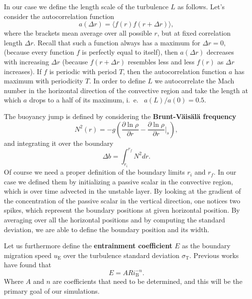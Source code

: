 In our case we define the length scale of the turbulence $L$ as follows. Let's consider the autocorrelation function 
\begin{equation}\label{correlation}
	a(\Delta r)= \langle f(r) f(r + \Delta r) \rangle,
\end{equation}
where the brackets mean average over all possible $r$, but at fixed correlation length $\Delta r$. Recall that such a function always has a maximum for $\Delta r=0$, (because every function $f$ is perfectly equal to itself), then $a(\Delta r)$ decreases with increasing $\Delta r$ (because $f(r+\Delta r)$ resembles less and less $f(r)$ as $\Delta r$ increases). If $f$ is periodic with period $T$, then the autocorrelation function $a$ has maximum with periodicity $T$. In order to define $L$ we autocorrelate the Mach number in the horizontal direction of the convective region and take the length at which $a$ drops to a half of its maximum, i.\ e. \ $a(L)/a(0)=0.5$.

The buoyancy jump is defined by considering the \textbf{Brunt-Väisälä frequency} 
\begin{equation}
	N^2(r)=-g \left (  \frac{\partial \ln \rho}{\partial r} -  \frac{\partial \ln \rho}{\partial r} \Big|_{s}  \right ),
\end{equation}
and integrating it over the boundary
\begin{equation}\label{eq:buoyancyjump}
	\Delta b = \int_{r_i}^{r_f} N^2 dr.
\end{equation}
Of course we need a proper definition of the boundary limits $r_i$ and $r_f$. In our case we defined them by initializing a passive scalar in the convective region, which is over time advected in the unstable layer. By looking at the gradient of the concentration of the passive scalar in the vertical direction, one notices two spikes, which represent the boundary positions at given horizontal position. By averaging over all the horizontal positions and by computing the standard deviation, we are able to define the boundary position and its width.

Let us furthermore define the \textbf{entrainment coefficient} $E$ as the boundary migration speed $u_{\mathrm{E}}$ over the turbulence standard deviation $\sigma_{\mathrm{T}}$. Previous works have found that
\begin{equation}\label{eq:bulkrichardson}
	E=A Ri_{\mathrm{B}}^{-n}.
\end{equation}
Where $A$ and $n$ are coefficients that need to be determined, and this will be the primary goal of our simulations.

